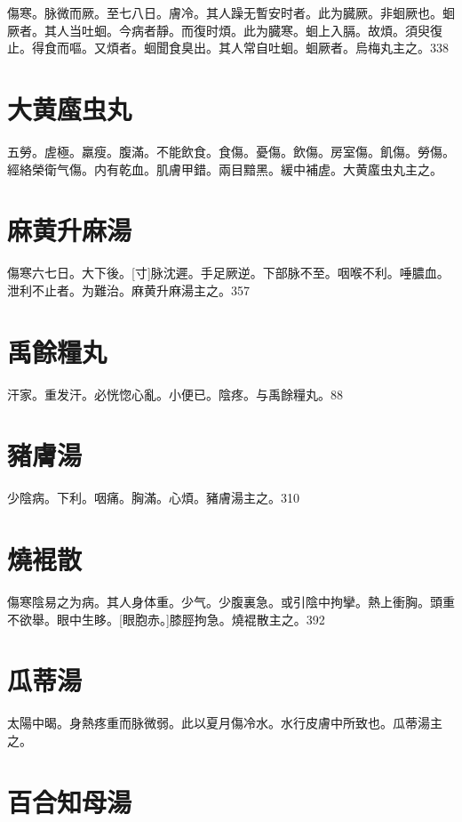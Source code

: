 \documentclass[12pt,twoside,UTF8,b5paper]{ctexbook}
\begin{document}
傷寒。脉微而厥。至七八日。膚冷。其人躁无暫安时者。此为臓厥。非蛔厥也。蛔厥者。其人当吐蛔。今病者靜。而復时煩。此为臓寒。蛔上入膈。故煩。須臾復止。得食而嘔。又煩者。蛔聞食臭出。其人常自吐蛔。蛔厥者。烏梅丸主之。338

\section{大黄䗪虫丸}

五勞。虗極。羸瘦。腹滿。不能飲食。食傷。憂傷。飲傷。房室傷。飢傷。勞傷。經絡榮衛气傷。内有乾血。肌膚甲錯。兩目黯黑。緩中補虗。大黄䗪虫丸主之。

\section{麻黄升麻湯}

傷寒六七日。大下後。[寸]脉沈遲。手足厥逆。下部脉不至。咽喉不利。唾膿血。泄利不止者。为難治。麻黄升麻湯主之。357

\section{禹餘糧丸}

汗家。重发汗。必恍惚心亂。小便已。陰疼。与禹餘糧丸。88

\section{豬膚湯}

少陰病。下利。咽痛。胸滿。心煩。豬膚湯主之。310

\section{燒裩散}

傷寒陰易之为病。其人身体重。少气。少腹裏急。或引陰中拘攣。熱上衝胸。頭重不欲舉。眼中生眵。[眼胞赤。]膝脛拘急。燒裩散主之。392

\section{瓜蒂湯}

太陽中暍。身熱疼重而脉微弱。此以夏月傷冷水。水行皮膚中所致也。瓜蒂湯主之。

\section{百合知母湯}
\end{document}
